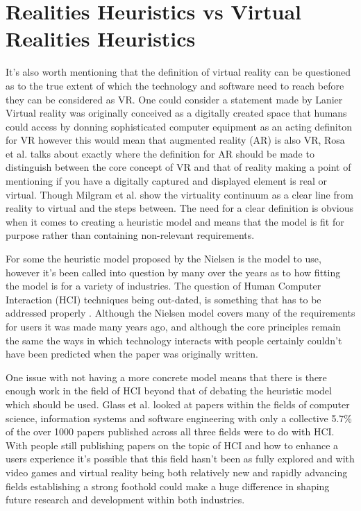 \documentclass{scrartcl}
\begin{document}
\section{Realities Heuristics vs Virtual Realities Heuristics}

It's also worth mentioning that the definition of virtual reality can be questioned as to the true extent of which the technology and software need to reach before they can be considered as VR. One could consider a statement made by Lanier \cite{lanier1992virtual} Virtual reality was originally conceived as a digitally created space that humans could access by donning sophisticated computer equipment as an acting definiton for VR however this would mean that augmented reality (AR) is also VR,  Rosa et al. talks about exactly where the definition for AR should be made to distinguish between the core concept of VR and that of reality making a point of mentioning if you have a digitally captured and displayed element is real or virtual. \cite{rosa2016re} Though  Milgram et al. \cite{milgram1994taxonomy} show the virtuality continuum as a clear line from reality to virtual and the steps between. The need for a clear definition is obvious when it comes to creating a heuristic model and means that the model is fit for purpose rather than containing non-relevant requirements. 

For some the heuristic model proposed by the Nielsen \cite{nielsen1990heuristic} is the model to use, however it's been called into question by many over the years as to how fitting the model is for a variety of industries. \cite{pinelle2008heuristic, pinelle2009usability, sutcliffe2004heuristic, john1998traditional} The question of Human Computer Interaction (HCI) techniques being out-dated, is something that has to be addressed properly \cite{hvannberg2012exploitation}. Although the Nielsen model covers many of the requirements for users it was made many years ago, and although the core principles remain the same the ways in which technology interacts with people certainly couldn't have been predicted when the paper was originally written. 

One issue with not having a more concrete model means that there is there enough work in the field of HCI beyond that of debating the heuristic model which should be used. Glass et al. \cite{glass2004analysis} looked at papers within the fields of computer science, information systems and software engineering with only a collective 5.7\% of the over 1000 papers published across all three fields were to do with HCI. With people still publishing papers on the topic of HCI and how to enhance a users experience it's possible that this field hasn't been as fully explored and with video games and virtual reality being both relatively new and rapidly advancing fields establishing a strong foothold could make a huge difference in shaping future research and development within both industries.
\end{document}

